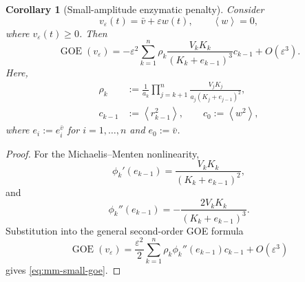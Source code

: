 \documentclass[10pt,a4paper]{amsart}
\newtheorem{corollary}{Corollary}
\newcommand{\GOE}{\operatorname{GOE}}
\newcommand{\avg}[1]{\left\langle #1\right\rangle}
\begin{document}
\begin{corollary}[Small-amplitude enzymatic penalty]
\label{cor:mm-small-amplitude}
Consider
\begin{equation}
    v_\varepsilon(t)
    =
    \bar v+\varepsilon w(t),
    \qquad
    \avg{w}=0,
    \label{eq:mm-small-input}
\end{equation}
where $v_\varepsilon(t)\geq0$. Then
\begin{equation}
    \GOE(v_\varepsilon)
    =
    -\varepsilon^2
    \sum_{k=1}^n
    \rho_k
    \frac{V_kK_k}
    {(K_k+e_{k-1})^3}
    c_{k-1}
    +
    O(\varepsilon^3).
    \label{eq:mm-small-goe}
\end{equation}
Here,
\begin{align}
    \rho_k
    &:=
    \frac{1}{a_k}
    \prod_{j=k+1}^n
    \frac{V_jK_j}
    {a_j(K_j+e_{j-1})^2},
    \label{eq:mm-rho}\\
    c_{k-1}
    &:=
    \avg{r_{k-1}^2},
    \qquad
    c_0:=\avg{w^2},
    \label{eq:mm-variance}
\end{align}
where $e_i:=e_i^{\bar v}$ for $i=1,\ldots,n$ and $e_0:=\bar v$.
\end{corollary}

\begin{proof}
For the Michaelis--Menten nonlinearity,
\begin{equation}
    \phi_k'(e_{k-1})
    =
    \frac{V_kK_k}
    {(K_k+e_{k-1})^2},
\end{equation}
and
\begin{equation}
    \phi_k''(e_{k-1})
    =
    -\frac{2V_kK_k}
    {(K_k+e_{k-1})^3}.
\end{equation}
Substitution into the general second-order GOE formula
\begin{equation}
    \GOE(v_\varepsilon)
    =
    \frac{\varepsilon^2}{2}
    \sum_{k=1}^n
    \rho_k
    \phi_k''(e_{k-1})
    c_{k-1}
    +
    O(\varepsilon^3)
\end{equation}
gives \eqref{eq:mm-small-goe}.
\end{proof}
\end{document}
